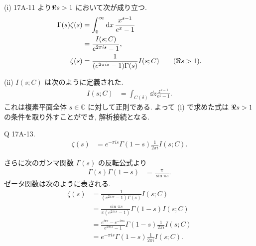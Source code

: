 \documentclass[uplatex,dvipdfmx,a4paper,11pt]{jlreq}
\newcommand{\CC}{\mathbb{C}}
\theoremstyle{definition}
\begin{document}
(i) 17A-11 より$\real s > 1$ において次が成り立つ.
\begin{align}
  \Gamma(s)\zeta(s) & = \int_0^\infty\dd{x}\frac{x^{s-1}}{e^x - 1}                        \\
                    & = \frac{I(s; C)}{e^{2\pi is} - 1},                                  \\
  \zeta(s)          & = \frac{1}{(e^{2\pi is} - 1)\Gamma(s)}I(s; C) \qquad (\real s > 1).
\end{align}

(ii)
$I(s; C)$ は次のように定義された.
\begin{align}
  I(s; C) & = \int_{C(\delta)}\dd{z}\frac{z^{s-1}}{e^z - 1}.
\end{align}
これは複素平面全体 $s\in\CC$ に対して正則である. よって (i) で求めた式は $\real s > 1$ の条件を取り外すことができ, 解析接続となる.

\begin{itembox}[l]{Q 17A-13.}
  \begin{align}
    \zeta(s) & = e^{-\pi is}\Gamma(1 - s)\frac{1}{2\pi i}I(s; C).
  \end{align}
\end{itembox}

さらに次のガンマ関数 $\Gamma(s)$ の反転公式より
\begin{align}
  \Gamma(s)\Gamma(1-s) & = \frac{\pi}{\sin\pi s}.
\end{align}
ゼータ関数は次のように表される.
\begin{align}
  \zeta(s) & = \frac{1}{(e^{2\pi is} - 1)\Gamma(s)}I(s; C)                                          \\
           & = \frac{\sin\pi s}{\pi(e^{2\pi is} - 1)}\Gamma(1 - s)I(s; C)                           \\
           & = \frac{e^{i\pi s} - e^{-i\pi s}}{e^{2\pi is} - 1}\Gamma(1 - s)\frac{1}{2\pi i}I(s; C) \\
           & = e^{-\pi is}\Gamma(1 - s)\frac{1}{2\pi i}I(s; C).
\end{align}
\end{document}
